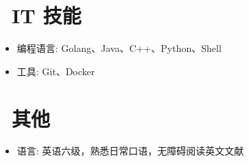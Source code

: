 \documentclass{resume}
\begin{document}

\section{\faCogs\ IT 技能}
\begin{itemize}[parsep=0.5ex]
  \item 编程语言: Golang、Java、C++、Python、Shell
  \item 工具: Git、Docker
\end{itemize}


\section{\faInfo\ 其他}
\begin{itemize}[parsep=0.5ex]
  \item 语言: 英语六级，熟悉日常口语，无障碍阅读英文文献
\end{itemize}

%
%
\end{document}
